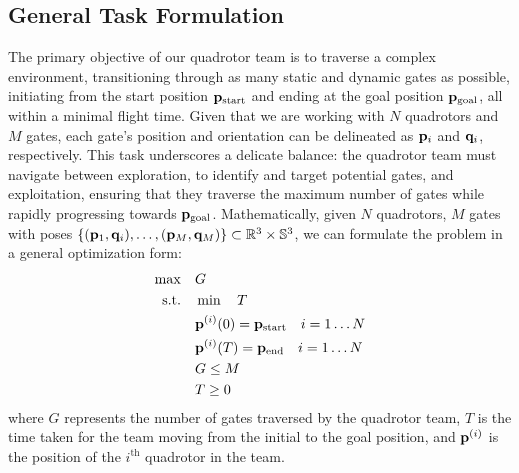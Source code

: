 \documentclass[letterpaper,journal,twoside]{IEEEtran}
\begin{document}
\subsection{General Task Formulation}

The primary objective of our quadrotor team is to traverse a 
complex environment, transitioning through as many static and 
dynamic gates as possible, initiating from the start position 
$ \mathbf{p}_{\text{start}} $ and ending at the goal position 
$ \mathbf{p}_{\text{goal}} $, all within a minimal flight time. 
Given that we are working with $ N $ quadrotors and $ M $ 
gates, 
each gate's position and orientation can be delineated as 
$ \mathbf{p}_i $
and $ \mathbf{q}_i$, respectively. 
This task underscores a delicate balance: 
the quadrotor team must navigate between 
exploration, to identify and target potential gates, 
and exploitation, 
ensuring that they traverse the maximum number of gates while 
rapidly progressing towards $ \mathbf{p}_{\text{goal}} $.
Mathematically, given $N$ quadrotors, $M$ gates 
with poses $\left\{(\mathbf{p}_1,\mathbf{q}_i), \dots, 
(\mathbf{p}_M, \mathbf{q}_M)\right\} 
\subset \mathbb{R}^3\times\mathbb{S}^3$, we can 
formulate the problem in a general optimization form:
\begin{equation}
  \label{eq:general_opt}
  \begin{aligned}
    \max \quad & G \\
    \textrm{s.t.} \quad & \min \quad T \\
    & \mathbf{p}^{(i)}(0) = \mathbf{p}_\text{start} \quad i = 1\dots N \\
    & \mathbf{p}^{(i)}(T) = \mathbf{p}_\text{end} \quad i = 1\dots N \\
    & G \le M \\
    & T \ge 0
  \end{aligned}
\end{equation}
where $G$ represents the number of gates traversed by the 
quadrotor team, $T$ is the time taken for the team moving
from the initial to the goal position, and $\mathbf{p}^{(i)}$ 
is the position of the $i^{\text{th}}$ quadrotor in the 
team. 

\end{document}
